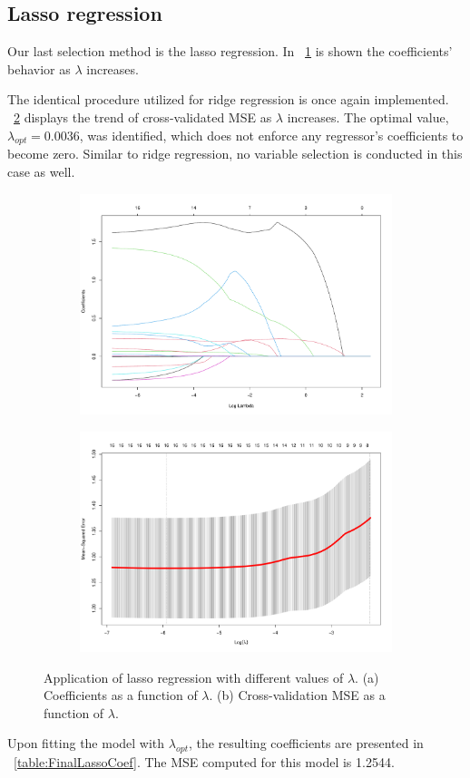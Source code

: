 \subsection{Lasso regression}

Our last selection method is the lasso regression. In \Fig~\ref{fig:LassoCoefVsLambda} is shown the coefficients' behavior as $\lambda$ increases. 

The identical procedure utilized for ridge regression is once again implemented. \Fig~\ref{fig:LassoCvPlot} displays the trend of cross-validated MSE as $\lambda$ increases. The optimal value, $\lambda_{opt} = 0.0036$, was identified, which does not enforce any regressor's coefficients to become zero. Similar to ridge regression, no variable selection is conducted in this case as well.

\begin{figure}[H]
	\centering
	\begin{subfigure}{.5\textwidth}
		\centering
		\includegraphics[width=0.7\linewidth]{ImageFiles/Regression/Lasso/LassoCoefVsLambda.pdf}
		\caption{}
		\label{fig:LassoCoefVsLambda}
	\end{subfigure}%
	\begin{subfigure}{.5\textwidth}
		\centering
		\includegraphics[width=0.7\linewidth]{ImageFiles/Regression/Lasso/LassoCvPlot.pdf}
		\caption{}
		\label{fig:LassoCvPlot}
	\end{subfigure}	
	\caption{Application of lasso regression with different values of $\lambda$. (a) Coefficients as a function of $\lambda$. (b) Cross-validation MSE as a function of $\lambda$.}
	\label{fig:FinalFSSM}
\end{figure}

Upon fitting the model with $\lambda_{opt}$, the resulting coefficients are presented in \Tab~\ref{table:FinalLassoCoef}. The MSE computed for this model is 1.2544.
